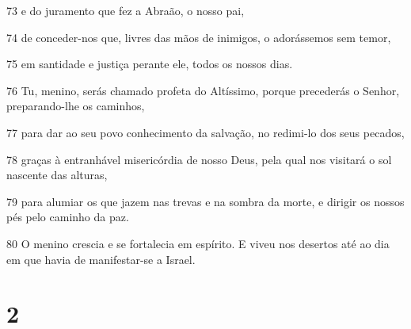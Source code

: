 \par 73 e do juramento que fez a Abraão, o nosso pai,
\par 74 de conceder-nos que, livres das mãos de inimigos, o adorássemos sem temor,
\par 75 em santidade e justiça perante ele, todos os nossos dias.
\par 76 Tu, menino, serás chamado profeta do Altíssimo, porque precederás o Senhor, preparando-lhe os caminhos,
\par 77 para dar ao seu povo conhecimento da salvação, no redimi-lo dos seus pecados,
\par 78 graças à entranhável misericórdia de nosso Deus, pela qual nos visitará o sol nascente das alturas,
\par 79 para alumiar os que jazem nas trevas e na sombra da morte, e dirigir os nossos pés pelo caminho da paz.
\par 80 O menino crescia e se fortalecia em espírito. E viveu nos desertos até ao dia em que havia de manifestar-se a Israel.

\chapter{2}

